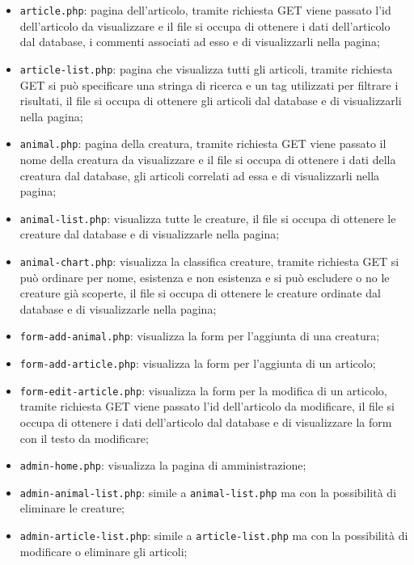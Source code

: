 \begin{itemize}
    \item \texttt{article.php}: pagina dell'articolo, tramite richiesta GET viene passato l'id dell'articolo da visualizzare e il file si occupa di ottenere i dati dell'articolo dal database, i commenti associati ad esso e di visualizzarli nella pagina;
    \item \texttt{article-list.php}: pagina che visualizza tutti gli articoli, tramite richiesta GET si può specificare una stringa di ricerca e un tag utilizzati per filtrare i risultati, il file si occupa di ottenere gli articoli dal database e di visualizzarli nella pagina;
    \item \texttt{animal.php}: pagina della creatura, tramite richiesta GET viene passato il nome della creatura da visualizzare e il file si occupa di ottenere i dati della creatura dal database, gli articoli correlati ad essa e di visualizzarli nella pagina;
    \item \texttt{animal-list.php}: visualizza tutte le creature, il file si occupa di ottenere le creature dal database e di visualizzarle nella pagina;
    \item \texttt{animal-chart.php}: visualizza la classifica creature, tramite richiesta GET si può ordinare per nome, esistenza e non esistenza e si può escludere o no le creature già scoperte, il file si occupa di ottenere le creature ordinate dal database e di visualizzarle nella pagina;
    \item \texttt{form-add-animal.php}: visualizza la form per l'aggiunta di una creatura;
    \item \texttt{form-add-article.php}: visualizza la form per l'aggiunta di un articolo;
    \item \texttt{form-edit-article.php}: visualizza la form per la modifica di un articolo, tramite richiesta GET viene passato l'id dell'articolo da modificare, il file si occupa di ottenere i dati dell'articolo dal database e di visualizzare la form con il testo da modificare;
    \item \texttt{admin-home.php}: visualizza la pagina di amministrazione;
    \item \texttt{admin-animal-list.php}: simile a \texttt{animal-list.php} ma con la possibilità di eliminare le creature;
    \item \texttt{admin-article-list.php}: simile a \texttt{article-list.php} ma con la possibilità di modificare o eliminare gli articoli;
\end{itemize}


